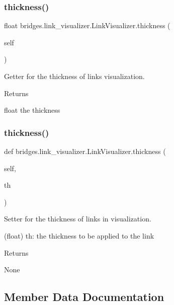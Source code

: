 \subsubsection{\texorpdfstring{thickness()}{thickness()}\hspace{0.1cm}{\footnotesize\ttfamily [1/2]}}
{\footnotesize\ttfamily  float bridges.\+link\+\_\+visualizer.\+Link\+Visualizer.\+thickness (\begin{DoxyParamCaption}\item[{}]{self }\end{DoxyParamCaption})}



Getter for the thickness of links visualization. 

\begin{DoxyReturn}{Returns}


float the thickness 
\end{DoxyReturn}
\mbox{\label{classbridges_1_1link__visualizer_1_1_link_visualizer_af244bbe99885785f7dd3bb9460c1d21a}} 
\subsubsection{\texorpdfstring{thickness()}{thickness()}\hspace{0.1cm}{\footnotesize\ttfamily [2/2]}}
{\footnotesize\ttfamily def bridges.\+link\+\_\+visualizer.\+Link\+Visualizer.\+thickness (\begin{DoxyParamCaption}\item[{}]{self,  }\item[{}]{th }\end{DoxyParamCaption})}



Setter for the thickness of links in visualization. 

\begin{DoxyVerb}       (float) th: the thickness to be applied to the link
\end{DoxyVerb}
 \begin{DoxyReturn}{Returns}


None 
\end{DoxyReturn}


\subsection{Member Data Documentation}
\mbox{\label{classbridges_1_1link__visualizer_1_1_link_visualizer_aace0e171fe2904f672b8ed3e0139343f}} 
